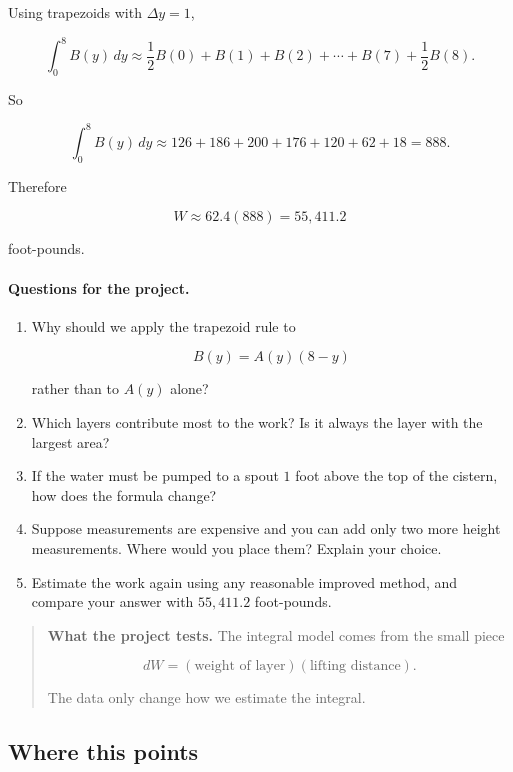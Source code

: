 Using trapezoids with \(\Delta y=1\),

\[
\int_0^8 B(y)\,dy
\approx
\frac12B(0)+B(1)+B(2)+\cdots+B(7)+\frac12B(8).
\]

So

\[
\int_0^8 B(y)\,dy
\approx
126+186+200+176+120+62+18
=
888.
\]

Therefore

\[
W\approx 62.4(888)=\boxed{55{,}411.2}
\]

foot-pounds.

\paragraph{Questions for the project.}

\begin{enumerate}
\item Why should we apply the trapezoid rule to

\[
B(y)=A(y)(8-y)
\]

rather than to \(A(y)\) alone?

\item Which layers contribute most to the work?  Is it always the layer with the largest
area?

\item If the water must be pumped to a spout \(1\) foot above the top of the cistern, how
does the formula change?

\item Suppose measurements are expensive and you can add only two more height
measurements.  Where would you place them?  Explain your choice.

\item Estimate the work again using any reasonable improved method, and compare your
answer with \(55{,}411.2\) foot-pounds.
\end{enumerate}

\begin{quote}
\textbf{What the project tests.}
The integral model comes from the small piece

\[
dW=(\text{weight of layer})(\text{lifting distance}).
\]

The data only change how we estimate the integral.
\end{quote}

\subsection{Where this points}
\label{subsec:chapter10-hook-techniques-of-integration}

